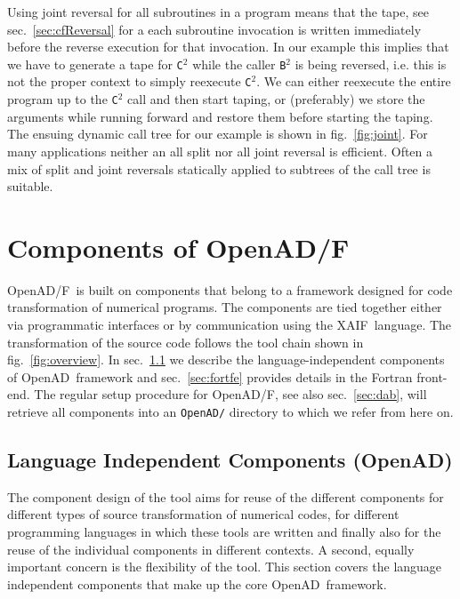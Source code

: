 \documentclass{book}
\newcommand{\OpenADF}{OpenAD/F}
\newcommand{\OpenAD}{OpenAD}
\newcommand{\xaif}{XAIF}
\newcommand{\refsec}[1]{{sec.~\ref{#1}}}
\newcommand{\reffig}[1]{{fig.~\ref{#1}}}
\begin{document}
Using joint reversal for all subroutines in a program 
means that the tape, see \refsec{sec:cfReversal} for a each 
subroutine invocation is written immediately before the reverse execution for 
that invocation. In our example this implies that we have to generate 
a tape for \lstinline{C}$^2$ while the caller \lstinline{B}$^2$ is being reversed, 
i.e. this is not the proper context to simply reexecute \lstinline{C}$^2$. 
We can either reexecute the entire program up to the  \lstinline{C}$^2$
call and then start taping, or (preferably) we store the arguments while 
running forward and restore them before starting the taping. 
The ensuing dynamic call tree for our example is 
shown in \reffig{fig:joint}. 
For many applications neither an all split nor all joint reversal
is efficient. Often a mix of split and joint reversals statically  
applied to subtrees of the call tree is suitable.  

\chapter{Components of \OpenADF}\label{sec:openadfcomponents}

\OpenADF\ is built on components that belong to a framework designed
for code transformation of numerical programs.  The components are
tied together either via programmatic interfaces or by communication
using the \xaif\ language. The transformation of the source code follows the
tool chain shown in \reffig{fig:overview}.  
In \refsec{sec:openadcomponents} we describe the language-independent 
components of \OpenAD\ framework and \refsec{sec:fortfe} provides details 
in the Fortran front-end.
The regular setup procedure for \OpenADF, see also \refsec{sec:dab}, 
will retrieve all components into an \lstinline{OpenAD/} directory to which 
we refer from here on.  

\section{Language Independent Components (\OpenAD)}\label{sec:openadcomponents}

The component design of the tool aims for reuse of the different components 
for different types of source transformation of numerical codes, for 
different programming languages in which these tools are written and finally 
also for the reuse of the individual components in different contexts. 
A second, equally important concern is the flexibility of the tool.  
This section covers the language independent components that make up the core \OpenAD\ framework. 
\end{document}
